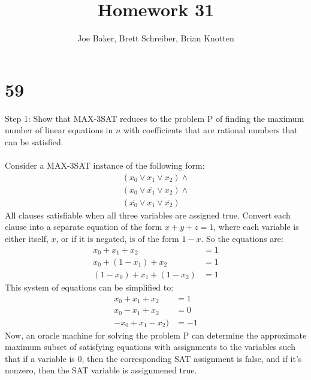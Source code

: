 \documentclass[letterpaper,notitlepage,twoside]{article}
\begin{document}
\title{Homework 31}
\author{Joe Baker, Brett Schreiber, Brian Knotten}
\maketitle

\section*{59}
Step 1: Show that MAX-3SAT reduces to the problem P of finding the maximum number of linear equations in $n$ with coefficients that are rational numbers that can be satisfied.
\\\\
Consider a MAX-3SAT instance of the following form:\\
\begin{gather*}
(x_0 \vee x_1 \vee x_2) \wedge \\
(x_0 \vee \overline{x_1} \vee x_2) \wedge \\
(\overline{x_0} \vee x_1 \vee \overline{x_2})
\end{gather*}
All clauses satisfiable when all three variables are assigned true.
Convert each clause into a separate equation of the form $x + y + z = 1$, where each variable is either itself, $x$, or if it is negated, is of the form $1 - x$. So the equations are:
\begin{align*}
x_0 + x_1 + x_2 &= 1 \\
x_0 + (1 - x_1) + x_2 &= 1 \\
(1 - x_0) + x_1 + (1 - x_2) &= 1
\end{align*}
This system of equations can be simplified to:
\begin{align*}
x_0 + x_1 + x_2 &= 1 \\
x_0 - x_1 + x_2 &= 0 \\
- x_0 + x_1 - x_2) &= -1
\end{align*}
Now, an oracle machine for solving the problem P can determine the approximate maximum subset of satisfying equations with assignments to the variables such that if a variable is 0, then the corresponding SAT assignment is false, and if it's nonzero, then the SAT variable is assignmened true.
\end{document}
